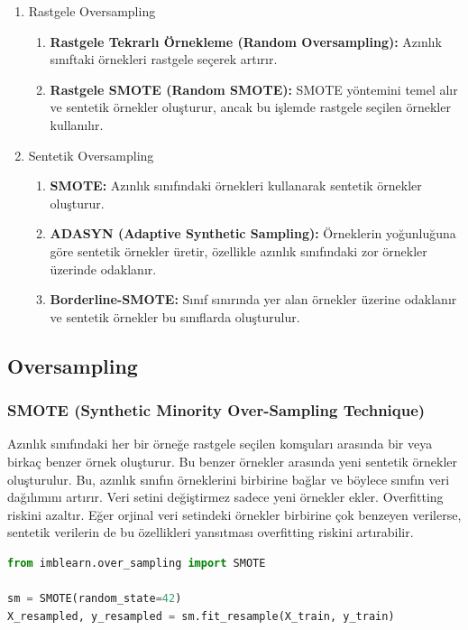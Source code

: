 \begin{enumerate}
    \item Rastgele Oversampling
    \begin{enumerate}
        \item \textbf{Rastgele Tekrarlı Örnekleme (Random Oversampling):} Azınlık sınıftaki örnekleri rastgele seçerek artırır.
        \item \textbf{Rastgele SMOTE (Random SMOTE):} SMOTE yöntemini temel alır ve sentetik örnekler oluşturur, ancak bu işlemde rastgele seçilen örnekler kullanılır.
    \end{enumerate}
    \item Sentetik Oversampling
    \begin{enumerate}
        \item \textbf{SMOTE:} Azınlık sınıfındaki örnekleri kullanarak sentetik örnekler oluşturur.
        \item \textbf{ADASYN (Adaptive Synthetic Sampling):} Örneklerin yoğunluğuna göre sentetik örnekler üretir, özellikle azınlık sınıfındaki zor örnekler üzerinde odaklanır.
        \item \textbf{Borderline-SMOTE:} Sınıf sınırında yer alan örnekler üzerine odaklanır ve sentetik örnekler bu sınıflarda oluşturulur.
    \end{enumerate}
\end{enumerate}

\newpage

\subsection{Oversampling}

\subsubsection{SMOTE (Synthetic Minority Over-Sampling Technique)}
Azınlık sınıfındaki her bir örneğe rastgele seçilen komşuları arasında bir veya birkaç benzer örnek oluşturur. Bu benzer örnekler arasında yeni sentetik örnekler oluşturulur. Bu, azınlık sınıfın örneklerini birbirine bağlar ve böylece sınıfın veri dağılımını artırır. Veri setini değiştirmez sadece yeni örnekler ekler. Overfitting riskini azaltır. Eğer orjinal veri setindeki örnekler birbirine çok benzeyen verilerse, sentetik verilerin de bu özellikleri yansıtması overfitting riskini artırabilir.

\begin{lstlisting}[language=Python]
from imblearn.over_sampling import SMOTE

sm = SMOTE(random_state=42)
X_resampled, y_resampled = sm.fit_resample(X_train, y_train)
\end{lstlisting}

